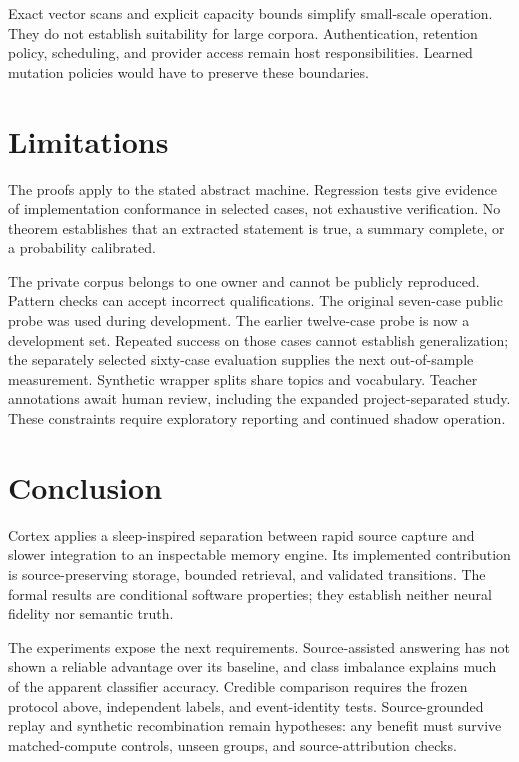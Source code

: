\documentclass[11pt]{article}
\begin{document}
Exact vector scans and explicit capacity bounds simplify small-scale operation. They do not establish suitability for large corpora. Authentication, retention policy, scheduling, and provider access remain host responsibilities. Learned mutation policies would have to preserve these boundaries.



\section{Limitations}
The proofs apply to the stated abstract machine. Regression tests give evidence of implementation conformance in selected cases, not exhaustive verification. No theorem establishes that an extracted statement is true, a summary complete, or a probability calibrated.

The private corpus belongs to one owner and cannot be publicly reproduced. Pattern checks can accept incorrect qualifications. The original seven-case public probe was used during development. The earlier twelve-case probe is now a development set. Repeated success on those cases cannot establish generalization; the separately selected sixty-case evaluation supplies the next out-of-sample measurement. Synthetic wrapper splits share topics and vocabulary. Teacher annotations await human review, including the expanded project-separated study. These constraints require exploratory reporting and continued shadow operation.



\section{Conclusion}
Cortex applies a sleep-inspired separation between rapid source capture and slower integration to an inspectable memory engine. Its implemented contribution is source-preserving storage, bounded retrieval, and validated transitions. The formal results are conditional software properties; they establish neither neural fidelity nor semantic truth.

The experiments expose the next requirements. Source-assisted answering has not shown a reliable advantage over its baseline, and class imbalance explains much of the apparent classifier accuracy. Credible comparison requires the frozen protocol above, independent labels, and event-identity tests. Source-grounded replay and synthetic recombination remain hypotheses: any benefit must survive matched-compute controls, unseen groups, and source-attribution checks.
\end{document}
